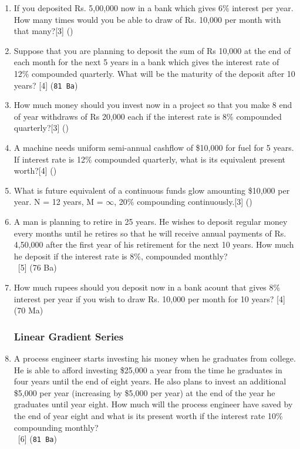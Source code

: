 \documentclass[12pt]{article}
\newcommand{\enter}{\\\textcolor{white}{1}}
\begin{document}
\begin{enumerate}[noitemsep, topsep=0pt]
			\item If you deposited Rs. 5,00,000 now in a bank which gives 6\% interest per year. How many times would you be able to draw of Rs. 10,000 per month with that many?\hfill[3] ()
	
			\item Suppose that you are planning to deposit the sum of Rs 10,000 at the end of each month for the next 5 years in a bank which gives the interest rate of 12\% compounded quarterly. What will be the maturity of the deposit after 10 years? \hfill[4] (\texttt{81 Ba})

			\item How much money should you invest now in a project so that you make 8 end of year withdraws of Rs 20,000 each if the interest rate is 8\% compounded quarterly?\hfill[3] ()

			\item A machine needs uniform semi-annual cashflow of \$10,000 for fuel for 5 years. If interest rate is 12\% compounded quarterly, what is its equivalent present worth?\hfill[4] ()

			\item What is future equivalent of a continuous funds glow amounting \$10,000 per year. N = 12 years, M = $\infty$, 20\% compounding continuously.\hfill[3] ()

			\item A man is planning to retire in 25 years. He wishes to deposit regular money every months until he retires so that he will receive annual payments of Rs. 4,50,000 after the first year of his retirement for the next 10 years. How much he deposit if the interest rate is 8\%, compounded monthly?
			\enter\hfill[5] (76 Ba)

			\item How much rupees should you deposit now in a bank acount that gives 8\% interest per year if you wish to draw Rs. 10,000 per month for 10 years? \hfill [4] (70 Ma)
		\subsubsection{Linear Gradient Series}

			\item A process engineer starts investing his money when he graduates from college. He is able to afford investing \$25,000 a year from the time he graduates in four years until the end of eight years. He also plans to invest an additional \$5,000 per year (increasing by \$5,000 per year) at the end of the year he graduates until year eight. How much will the process engineer have saved by the end of year eight and what is its present worth if the interest rate 10\% compounding monthly?
			\enter\hfill [6] (\texttt{81 Ba})


\end{enumerate}
\end{document}
